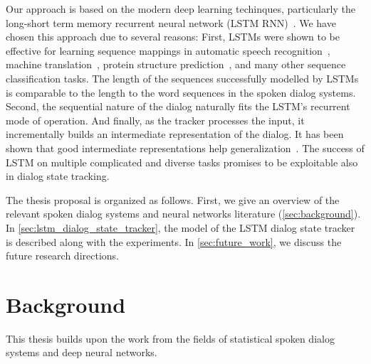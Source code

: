 \documentclass[10pt,twocolumn]{article}
\begin{document}
Our approach is based on the modern deep learning techinques, particularly the long-short term memory recurrent neural network (LSTM RNN)~\cite{hochreiter1997long}.
We have chosen this approach due to several reasons:
First, LSTMs were shown to be effective for learning sequence mappings in automatic speech recognition~\cite{graves2005framewise}, machine translation~\cite{sutskever2014sequence}, protein structure prediction~\cite{sonderby2014protein}, and many other sequence classification tasks. The length of the sequences successfully modelled by LSTMs is comparable to the length to the word sequences in the spoken dialog systems.
Second, the sequential nature of the dialog naturally fits the LSTM's recurrent mode of operation. And finally, as the tracker processes the input, it incrementally builds an intermediate representation of the dialog. It has been shown that good intermediate representations help generalization~\cite{gulccehre2013knowledge}.
The success of LSTM on multiple complicated and diverse tasks promises to be exploitable also in dialog state tracking.


The thesis proposal is organized as follows. First, we give an overview of the relevant spoken dialog systems and neural networks literature (\autoref{sec:background}). In \autoref{sec:lstm_dialog_state_tracker}, the model of the LSTM dialog state tracker is described along with the experiments. In \autoref{sec:future_work}, we discuss the future research directions.


\section{Background}
\label{sec:background}
This thesis builds upon the work from the fields of statistical spoken dialog systems and deep neural networks.
\end{document}

